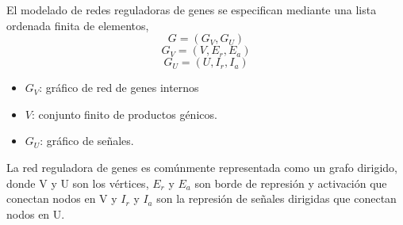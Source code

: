 \documentclass[10pt,conference]{IEEEtran}
\begin{document}
El modelado de redes reguladoras de genes se especifican mediante una lista ordenada finita de elementos,
\begin{equation}G=(G_{V},G_{U})\end{equation}
\begin{equation}G_{V}=(V,E_{r},E_{a})\end{equation}
\begin{equation}G_{U}=(U,I_{r},I_{a})\end{equation}
 \begin{itemize}
     \item \begin{math}G_{V}\end{math}: gráfico de red de genes internos
     \item \begin{math}V\end{math}: conjunto finito de productos génicos.
     \item \begin{math}G_{U}\end{math}: gráfico de señales.
 \end{itemize}
 La red reguladora de genes es comúnmente representada como un grafo dirigido, donde V y U son los vértices, \begin{math}E_{r}\end{math} y \begin{math}E_{a}\end{math} son borde de represión y activación que conectan nodos en V y \begin{math}I_{r}\end{math} y \begin{math}I_{a}\end{math} son la represión 
 de señales dirigidas que conectan nodos en U.
 
 
\vspace{2mm}
\end{document}
